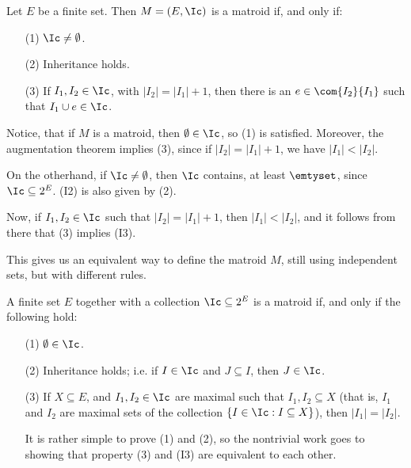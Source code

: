 \begin{example}\label{1.2}
    Let $E$ be a finite set. Then $M=(E,\Ic)$ is a matroid if, and only if:
    \begin{enumerate}
        \item[(1)] $\Ic \neq \emptyset$.

        \item[(2)] Inheritance holds.

        \item[(3)] If $I_1,I_2 \in \Ic$, with $|I_2|=|I_1|+1$, then there is an
            $e \in \com{I_2}{I_1}$ such that $I_1 \cup e \in \Ic$.
    \end{enumerate}

    Notice, that if $M$ is a matroid, then  $\emptyset \in \Ic$, so  (1) is
    satisfied. Moreover, the augmentation theorem implies (3), since if
    $|I_2|=|I_1|+1$, we have $|I_1|<|I_2|$.

    On the otherhand, if $\Ic \neq \emptyset$, then $\Ic$ contains, at least
    $\emtyset$, since  $\Ic \subseteq 2^E$. (I2) is also given by (2).

    Now, if $I_1, I_2 \in \Ic$ such that $|I_2|=|I_1|+1$, then $|I_1|<|I_2|$,
    and it follows from there that (3) implies (I3).

    This gives us an equivalent way to define the matroid $M$, still using
    independent sets, but with different rules.
\end{example}

\begin{example}\label{1.3}
    A finite set $E$ together with a collection  $\Ic \subseteq 2^E$ is a
    matroid if, and only if the following hold:
    \begin{enumerate}
        \item[(1)] $\emptyset \in \Ic$.

        \item [(2)] Inheritance holds; i.e. if $I \in \Ic$ and  $J \subseteq I$,
            then  $J \in \Ic$.

        \item[(3)] If $X \subseteq E$, and  $I_1,I_2 \in \Ic$ are maximal such
            that $I_1,I_2 \subseteq X$ (that is, $I_1$ and $I_2$ are maximal
            sets of the collection $\{I \in \Ic : I \subseteq X\}$), then
            $|I_1|=|I_2|$.

            It is rather simple to prove (1) and (2), so the nontrivial work
            goes to showing that property (3) and (I3) are equivalent to each
            other.
    \end{enumerate}
\end{example}

